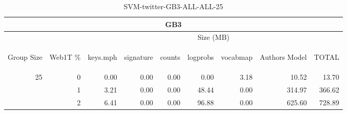 \begin{center}
\begin{table}[htbp] 
 \begin{center}
\begin{tabular}{ | r | r | r | r | r | r | r | r | r |}
\hline
\multicolumn{9}{|c|}{GB3}\\
\hline
 & & \multicolumn{7}{|c|}{Size (MB)}\\ \cline{3-9}
\begin{sideways}Group Size\end{sideways} & \begin{sideways}Web1T \% \end{sideways} & \begin{sideways}keys.mph\end{sideways} & \begin{sideways}signature\end{sideways} & \begin{sideways}counts\end{sideways} & \begin{sideways}logprobs\end{sideways} & \begin{sideways}vocabmap\end{sideways} & \begin{sideways}Authors Model \end{sideways} & \begin{sideways}TOTAL\end{sideways}\\
\hline
\multirow{2}{*}{25}
 & 0 & 0.00 & 0.00 & 0.00 & 0.00 & 3.18 & 10.52 & 13.70\\ \cline{2-9}
 & 1 & 3.21 & 0.00 & 0.00 & 48.44 & 0.00 & 314.97 & 366.62\\ \cline{2-9}
 & 2 & 6.41 & 0.00 & 0.00 & 96.88 & 0.00 & 625.60 & 728.89\\ \cline{2-9}
\hline
\end{tabular}
\caption{SVM-twitter-GB3-ALL-ALL-25}
\label{table:SVM-twitter-GB3-ALL-ALL-25}
\end{center}
 \end{table}
\end{center}

